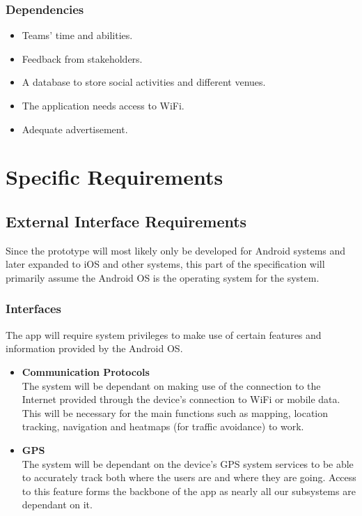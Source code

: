 \documentclass[english]{article}
\begin{document}
\begin{large}
	\subsubsection{Dependencies}
	\end{large}
	\begin{itemize}
		\item Teams' time and abilities. 
		\item Feedback from stakeholders. 
		\item A database to store social activities and different venues.
		\item The application needs access to WiFi.
		\item Adequate advertisement. 

	\end{itemize}
	\newpage

	\section{Specific Requirements}
				\subsection{External Interface Requirements}
					    Since the prototype will most likely only be developed for Android systems and later expanded to iOS and other systems, this part of the specification will primarily assume the Android OS is the operating system for the system.
					    \subsubsection{Interfaces} 
					     The app will require system privileges to make use of certain features and information provided by the Android OS.
					    \begin{itemize}
					        \item  \textbf{Communication Protocols}\\
					        The system will be dependant on making use of the connection to the Internet provided through the device's connection to WiFi or mobile data. This will be necessary for the main functions such as mapping, location tracking, navigation and heatmaps (for traffic avoidance) to work.
					        \item \textbf{GPS}\\
					        The system will be dependant on the device's GPS system services to be able to accurately track both where the users are and where they are going. Access to this feature forms the backbone of the app as nearly all our subsystems are dependant on it.
					    \end{itemize}
\end{document}
